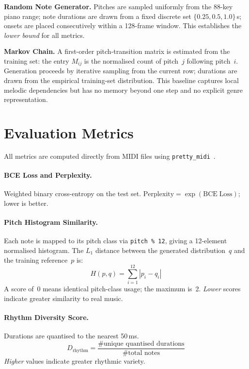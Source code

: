 \documentclass[letterpaper]{article}
\begin{document}
\textbf{Random Note Generator.}
Pitches are sampled uniformly from the 88-key piano range; note durations
are drawn from a fixed discrete set $\{0.25, 0.5, 1.0\}$\,s; onsets are
placed consecutively within a 128-frame window.  This establishes the
\emph{lower bound} for all metrics.

\textbf{Markov Chain.}
A first-order pitch-transition matrix is estimated from the training set:
the entry $M_{ij}$ is the normalised count of pitch~$j$ following
pitch~$i$.  Generation proceeds by iterative sampling from the current
row; durations are drawn from the empirical training-set distribution.
This baseline captures local melodic dependencies but has no memory
beyond one step and no explicit genre representation.

\section{Evaluation Metrics}
\label{sec:metrics}

All metrics are computed directly from MIDI files using
\texttt{pretty\_midi}~\cite{prettymidi}.

\paragraph{BCE Loss and Perplexity.}
Weighted binary cross-entropy on the test set.
$\mathrm{Perplexity} = \exp(\mathrm{BCE\;Loss})$; lower is better.

\paragraph{Pitch Histogram Similarity.}
Each note is mapped to its pitch class via \texttt{pitch\,\%\,12},
giving a 12-element normalised histogram.  The $L_1$ distance between the
generated distribution~$q$ and the training reference~$p$ is:
\begin{equation}
  H(p, q) = \sum_{i=1}^{12} |p_i - q_i|
\end{equation}
A score of~0 means identical pitch-class usage; the maximum is~2.
\emph{Lower} scores indicate greater similarity to real music.

\paragraph{Rhythm Diversity Score.}
Durations are quantised to the nearest 50\,ms.
\begin{equation}
  D_\mathrm{rhythm} =
    \frac{\#\text{unique quantised durations}}{\#\text{total notes}}
\end{equation}
\emph{Higher} values indicate greater rhythmic variety.
\end{document}
